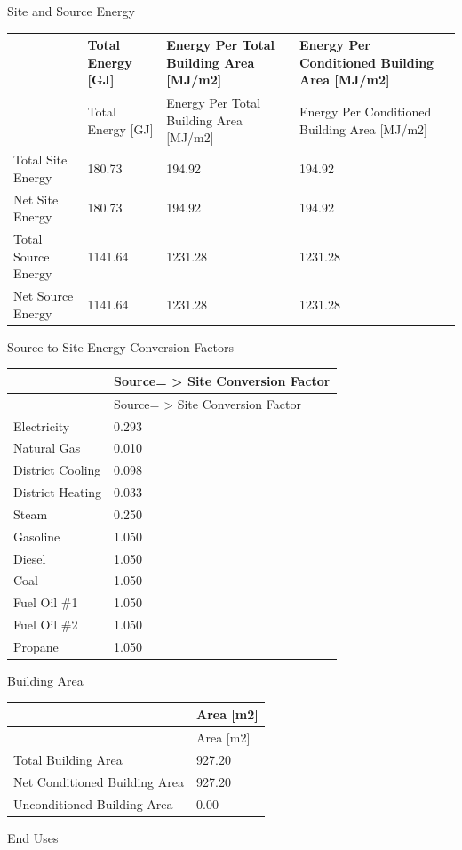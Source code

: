 Site and Source Energy

\begin{longtable}[c]{p{1.5in}p{1.5in}>{\raggedright}p{1.5in}>{\raggedright}p{1.5in}}
\toprule
~ & Total Energy [GJ] & Energy Per Total Building Area [MJ/m2] & Energy Per Conditioned Building Area [MJ/m2] \tabularnewline
\midrule
\endfirsthead

\toprule
~ & Total Energy [GJ] & Energy Per Total Building Area [MJ/m2] & Energy Per Conditioned Building Area [MJ/m2] \tabularnewline
\midrule
\endhead

Total Site Energy & 180.73 & 194.92 & 194.92 \tabularnewline
Net Site Energy & 180.73 & 194.92 & 194.92 \tabularnewline
Total Source Energy & 1141.64 & 1231.28 & 1231.28 \tabularnewline
Net Source Energy & 1141.64 & 1231.28 & 1231.28 \tabularnewline
\bottomrule
\end{longtable}

Source to Site Energy Conversion Factors

\begin{longtable}[c]{@{}ll@{}}
\toprule
~ & Source= > Site Conversion Factor \tabularnewline
\midrule
\endfirsthead

\toprule
~ & Source= > Site Conversion Factor \tabularnewline
\midrule
\endhead

Electricity & 0.293 \tabularnewline
Natural Gas & 0.010 \tabularnewline
District Cooling & 0.098 \tabularnewline
District Heating & 0.033 \tabularnewline
Steam & 0.250 \tabularnewline
Gasoline & 1.050 \tabularnewline
Diesel & 1.050 \tabularnewline
Coal & 1.050 \tabularnewline
Fuel Oil \#1 & 1.050 \tabularnewline
Fuel Oil \#2 & 1.050 \tabularnewline
Propane & 1.050 \tabularnewline
\bottomrule
\end{longtable}

Building Area

\begin{longtable}[c]{@{}ll@{}}
\toprule
~ & Area [m2] \tabularnewline
\midrule
\endfirsthead

\toprule
~ & Area [m2] \tabularnewline
\midrule
\endhead

Total Building Area & 927.20 \tabularnewline
Net Conditioned Building Area & 927.20 \tabularnewline
Unconditioned Building Area & 0.00 \tabularnewline
\bottomrule
\end{longtable}

End Uses

